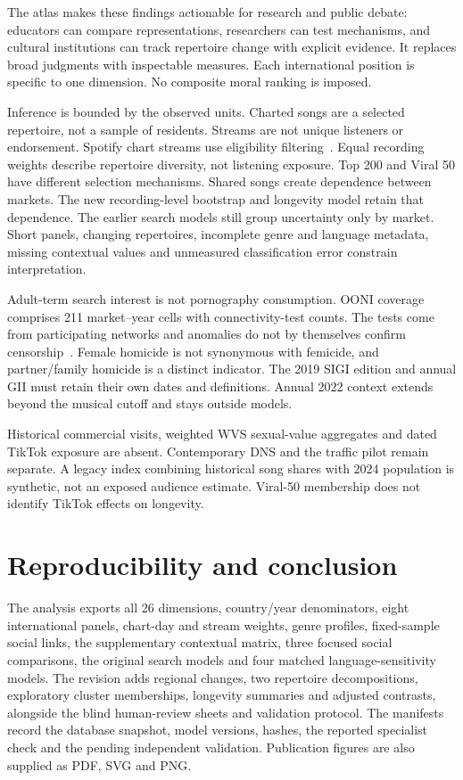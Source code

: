 \documentclass[10pt,a4paper,twocolumn]{article}
\begin{document}
The atlas makes these findings actionable for research and public debate: educators can compare representations, researchers can test mechanisms, and cultural institutions can track repertoire change with explicit evidence. It replaces broad judgments with inspectable measures. Each international position is specific to one dimension. No composite moral ranking is imposed.

Inference is bounded by the observed units. Charted songs are a selected repertoire, not a sample of residents. Streams are not unique listeners or endorsement. Spotify chart streams use eligibility filtering~\cite{spotify}. Equal recording weights describe repertoire diversity, not listening exposure. Top 200 and Viral 50 have different selection mechanisms. Shared songs create dependence between markets. The new recording-level bootstrap and longevity model retain that dependence. The earlier search models still group uncertainty only by market. Short panels, changing repertoires, incomplete genre and language metadata, missing contextual values and unmeasured classification error constrain interpretation.

Adult-term search interest is not pornography consumption. OONI coverage comprises 211 market--year cells with connectivity-test counts. The tests come from participating networks and anomalies do not by themselves confirm censorship~\cite{ooni}. Female homicide is not synonymous with femicide, and partner/family homicide is a distinct indicator. The 2019 SIGI edition and annual GII must retain their own dates and definitions. Annual 2022 context extends beyond the musical cutoff and stays outside models.

Historical commercial visits, weighted WVS sexual-value aggregates and dated TikTok exposure are absent. Contemporary DNS and the traffic pilot remain separate. A legacy index combining historical song shares with 2024 population is synthetic, not an exposed audience estimate. Viral-50 membership does not identify TikTok effects on longevity.

\section{Reproducibility and conclusion}
The analysis exports all 26 dimensions, country/year denominators, eight international panels, chart-day and stream weights, genre profiles, fixed-sample social links, the supplementary contextual matrix, three focused social comparisons, the original search models and four matched language-sensitivity models. The revision adds regional changes, two repertoire decompositions, exploratory cluster memberships, longevity summaries and adjusted contrasts, alongside the blind human-review sheets and validation protocol. The manifests record the database snapshot, model versions, hashes, the reported specialist check and the pending independent validation. Publication figures are also supplied as PDF, SVG and PNG.
\end{document}
